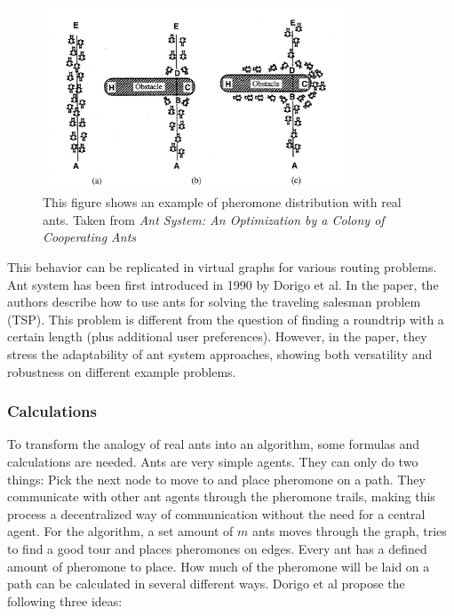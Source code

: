 \begin{figure}[H]
	\begin{centering}
		\includegraphics[width=0.8\textwidth]{bilder/antSystemExampleIllustration.png}
		\caption{This figure shows an example of pheromone distribution with real ants. Taken from \textit{Ant System: An Optimization by a Colony of Cooperating Ants}\cite{dorigo_ant_1996}}
		\label{fig:antSystemExampleIllustration}
	\end{centering}
\end{figure}


This behavior can be replicated in virtual graphs for various routing problems.
Ant system has been first introduced in 1990 by Dorigo et al\cite{dorigo_ant_1996}.
In the paper, the authors describe how to use ants for solving the traveling salesman problem (TSP).
This problem is different from the question of finding a roundtrip with a certain length (plus additional user preferences).
However, in the paper, they stress the adaptability of ant system approaches, showing both versatility and robustness on different example problems\cite{dorigo_ant_1996}.


\subsubsection{Calculations}
\label{subsubsec:antCalculations}

To transform the analogy of real ants into an algorithm, some formulas and calculations are needed.
Ants are very simple agents. 
They can only do two things:
Pick the next node to move to and place pheromone on a path.
They communicate with other ant agents through the pheromone trails, making this process a decentralized way of communication without the need for a central agent.
For the algorithm, a set amount of $m$ ants moves through the graph, tries to find a good tour and places pheromones on edges.
Every ant has a defined amount of pheromone to place. 
How much of the pheromone will be laid on a path can be calculated in several different ways. 
Dorigo et al propose the following three ideas\cite{dorigo_ant_1996}:

